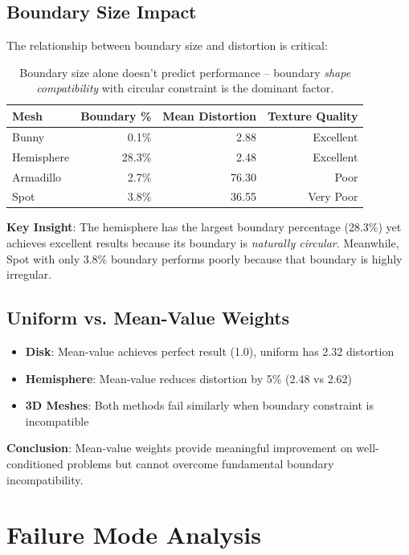 \documentclass[11pt]{article}
\begin{document}
\subsection{Boundary Size Impact}

The relationship between boundary size and distortion is critical:

\begin{table}[H]
\centering
\begin{tabular}{lrrr}
\toprule
\textbf{Mesh} & \textbf{Boundary \%} & \textbf{Mean Distortion} & \textbf{Texture Quality} \\
\midrule
Bunny & 0.1\% & 2.88 & Excellent \\
Hemisphere & 28.3\% & 2.48 & Excellent \\
Armadillo & 2.7\% & 76.30 & Poor \\
Spot & 3.8\% & 36.55 & Very Poor \\
\bottomrule
\end{tabular}
\caption{Boundary size alone doesn't predict performance -- boundary \textit{shape compatibility} with circular constraint is the dominant factor.}
\end{table}

\textbf{Key Insight}: The hemisphere has the largest boundary percentage (28.3\%) yet achieves excellent results because its boundary is \textit{naturally circular}. Meanwhile, Spot with only 3.8\% boundary performs poorly because that boundary is highly irregular.

\subsection{Uniform vs. Mean-Value Weights}

\begin{itemize}
    \item \textbf{Disk}: Mean-value achieves perfect result (1.0), uniform has 2.32 distortion
    \item \textbf{Hemisphere}: Mean-value reduces distortion by 5\% (2.48 vs 2.62)
    \item \textbf{3D Meshes}: Both methods fail similarly when boundary constraint is incompatible
\end{itemize}

\textbf{Conclusion}: Mean-value weights provide meaningful improvement on well-conditioned problems but cannot overcome fundamental boundary incompatibility.

\section{Failure Mode Analysis}
\end{document}
